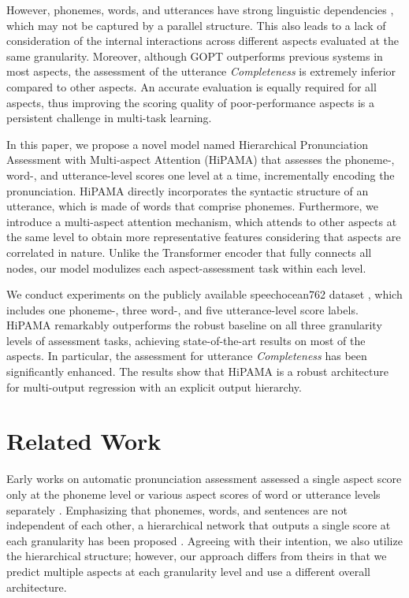 \documentclass{article}
\begin{document}
However, phonemes, words, and utterances have strong linguistic dependencies \cite{lin2020automatic}, which may not be captured by a parallel structure. This also leads to a lack of consideration of the internal interactions across different aspects evaluated at the same granularity. Moreover, although GOPT outperforms previous systems in most aspects, the assessment of the utterance \textit{Completeness} is extremely inferior compared to other aspects. An accurate evaluation is equally required for all aspects, thus improving the scoring quality of poor-performance aspects is a persistent challenge in multi-task learning.

In this paper, we propose a novel model named Hierarchical Pronunciation Assessment with Multi-aspect Attention (HiPAMA) that assesses the phoneme-, word-, and utterance-level scores one level at a time, incrementally encoding the pronunciation. HiPAMA directly incorporates the syntactic structure of an utterance, which is made of words that comprise phonemes. Furthermore, we introduce a multi-aspect attention mechanism, which attends to other aspects at the same level to obtain more representative features considering that aspects are correlated in nature. Unlike the Transformer encoder that fully connects all nodes, our model modulizes each aspect-assessment task within each level.

We conduct experiments on the publicly available speechocean762 dataset \cite{zhang2021speechocean762}, which includes one phoneme-, three word-, and five utterance-level score labels. HiPAMA remarkably outperforms the robust baseline \cite{gong2022transformer} on all three granularity levels of assessment tasks, achieving state-of-the-art results on most of the aspects. In particular, the assessment for utterance \textit{Completeness} has been significantly enhanced. The results show that HiPAMA is a robust architecture for multi-output regression with an explicit output hierarchy.

\section{Related Work}
\label{sec:format}
Early works on automatic pronunciation assessment assessed a single aspect score only at the phoneme level \cite{witt2000phone, wang2012improved, shi2020context} or various aspect scores of word or utterance levels separately \cite{1415269, cucchiarini2000quantitative, li2017intonation}. Emphasizing that phonemes, words, and sentences are not independent of each other, a hierarchical network that outputs a single score at each granularity has been proposed \cite{lin2020automatic}. Agreeing with their intention, we also utilize the hierarchical structure; however, our approach differs from theirs in that we predict multiple aspects at each granularity level and use a different overall architecture.
\end{document}
